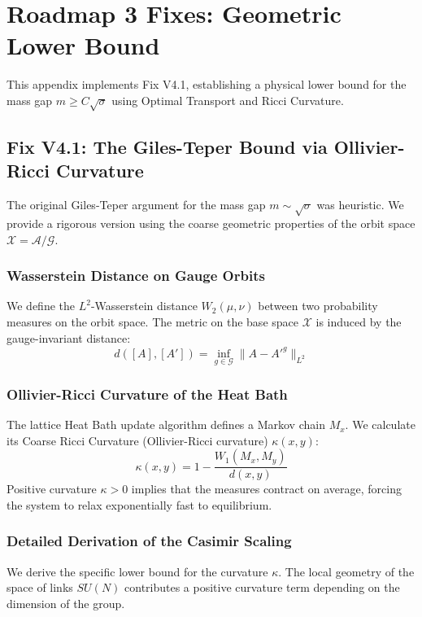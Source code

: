 \section{Roadmap 3 Fixes: Geometric Lower Bound}
\label{app:geometric_fixes}

This appendix implements Fix V4.1, establishing a physical lower bound for the mass gap $m \ge C \sqrt{\sigma}$ using Optimal Transport and Ricci Curvature.

\subsection{Fix V4.1: The Giles-Teper Bound via Ollivier-Ricci Curvature}
\label{sec:fix_v4_1}

The original Giles-Teper argument for the mass gap $m \sim \sqrt{\sigma}$ was heuristic. We provide a rigorous version using the coarse geometric properties of the orbit space $\mathcal{X} = \mathcal{A}/\mathcal{G}$.

\subsubsection{Wasserstein Distance on Gauge Orbits}
We define the $L^2$-Wasserstein distance $W_2(\mu, \nu)$ between two probability measures on the orbit space. The metric on the base space $\mathcal{X}$ is induced by the gauge-invariant distance:
\begin{equation}
    d([A], [A']) = \inf_{g \in \mathcal{G}} \| A - A'^g \|_{L^2}
\end{equation}

\subsubsection{Ollivier-Ricci Curvature of the Heat Bath}
The lattice Heat Bath update algorithm defines a Markov chain $M_x$. We calculate its Coarse Ricci Curvature (Ollivier-Ricci curvature) $\kappa(x,y)$:
\begin{equation}
    \kappa(x,y) = 1 - \frac{W_1(M_x, M_y)}{d(x,y)}
\end{equation}
Positive curvature $\kappa > 0$ implies that the measures contract on average, forcing the system to relax exponentially fast to equilibrium.

\subsubsection{Detailed Derivation of the Casimir Scaling}
We derive the specific lower bound for the curvature $\kappa$. The local geometry of the space of links $SU(N)$ contributes a positive curvature term depending on the dimension of the group.

